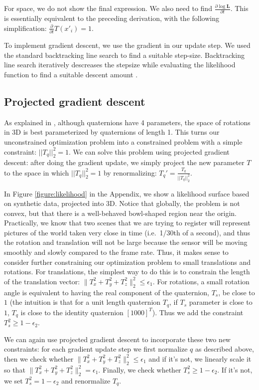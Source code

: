 \documentclass{article} %
\begin{document}
For space, we do not show the final expression. We also need to find $\frac{\partial \log \mathbf{L}}{\partial t}$. This is essentially
equivalent to the preceding derivation, with the following simplification: $\frac{\partial }{\partial t} T(x'_i) = 1$.

To implement gradient descent, we use the gradient in our update step. We used the standard backtracking line search to find a suitable step-size. Backtracking line search iteratively descreases the stepsize while evaluating the likelihood function to find a suitable descent amount \cite[p. 464]{boyd2004convex}.

\subsection{Projected gradient descent}
As explained in \cite{wheeler1995}, although quaternions have 4 parameters, the space of rotations in 3D is best parameterized by quaternions of length 1. This turns our unconstrained optimization problem into a constrained problem with a simple constraint: $||T_q||^2_2 = 1$. We can solve this problem using projected gradient descent: after doing the gradient update, we simply project the new parameter $T$ to the space in which $||T_q||^2_2 = 1$
by renormalizing: $T_q' = \frac{T_q}{||T_q||^2_2}$.

In Figure \ref{figure:likelihood} in the Appendix, we show a likelihood surface based on synthetic data, projected into 3D. Notice that globally, the problem is not convex, but that there is a well-behaved bowl-shaped region near the origin. Practically, we know that two scenes that we are trying to register will represent pictures of the world taken very close in time (i.e.~1/30th of a second), and thus the rotation and translation will not be large because the sensor will be moving smoothly and slowly compared to the frame rate. Thus, it makes sense to consider further constraining our optimization problem to small translations and rotations. For translations, the simplest way to do this is to constrain the length of the translation vector: $\|T_x^2 + T_y^2 + T_z^2\|^2_2 \leq \epsilon_1$. For rotations, a small rotation angle is equivalent to having the real component of the quaternion, $T_s$, be close to $1$ \cite{wheeler1995} (the intuition is that for a unit length quaternion $T_q$, if $T_s$ parameter is close to $1$, $T_q$ is close to the identity quaternion $[1 0 0 0]^T$). Thus we add the constraint $T_s^2 \geq 1-\epsilon_2$.

We can again use projected gradient descent to incorporate these two new constraints: for each gradient update step we first normalize $q$ as described above, then we check whether $\|T_x^2 + T_y^2 + T_z^2\|^2_2 \leq \epsilon_1$ and if it's not, we linearly scale it so that $\|T_x^2 + T_y^2 + T_z^2\|^2_2 = \epsilon_1$. Finally, we check whether $T_s^2 \geq 1-\epsilon_2$. If it's not, we set $T_s^2 = 1-\epsilon_2$ and renormalize $T_q$. 
\end{document}
